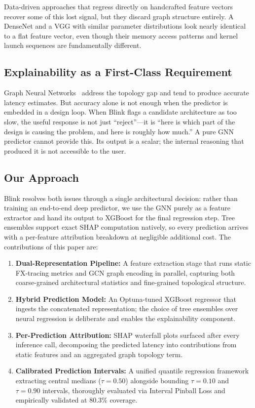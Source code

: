 \documentclass[conference]{IEEEtran}
\begin{document}
Data-driven approaches that regress directly on handcrafted feature
vectors~\cite{lee2021hardware} recover some of this lost signal, but they
discard graph structure entirely. A DenseNet and a VGG with similar parameter
distributions look nearly identical to a flat feature vector, even though their
memory access patterns and kernel launch sequences are fundamentally different.

\subsection{Explainability as a First-Class Requirement}

Graph Neural Networks~\cite{dudziak2020brp} address the topology gap and tend to
produce accurate latency estimates. But accuracy alone is not enough when the
predictor is embedded in a design loop. When Blink flags a candidate architecture
as too slow, the useful response is not just ``reject''---it is ``here is which
part of the design is causing the problem, and here is roughly how much.'' A pure
GNN predictor cannot provide this. Its output is a scalar; the internal reasoning
that produced it is not accessible to the user.

\subsection{Our Approach}

Blink resolves both issues through a single architectural decision: rather than
training an end-to-end deep predictor, we use the GNN purely as a feature
extractor and hand its output to XGBoost for the final regression step. Tree
ensembles support exact SHAP computation natively, so every prediction arrives
with a per-feature attribution breakdown at negligible additional cost. The
contributions of this paper are:

\begin{enumerate}
    \item \textbf{Dual-Representation Pipeline:} A feature extraction stage that
    runs static FX-tracing metrics and GCN graph encoding in parallel, capturing
    both coarse-grained architectural statistics and fine-grained topological
    structure.
    \item \textbf{Hybrid Prediction Model:} An Optuna-tuned XGBoost regressor
    that ingests the concatenated representation; the choice of tree ensembles
    over neural regression is deliberate and enables the explainability
    component.
    \item \textbf{Per-Prediction Attribution:} SHAP waterfall plots surfaced
    after every inference call, decomposing the predicted latency into
    contributions from static features and an aggregated graph topology term.
    \item \textbf{Calibrated Prediction Intervals:} A unified quantile regression
    framework extracting central medians ($\tau=0.50$) alongside bounding
    $\tau=0.10$ and $\tau=0.90$ intervals, thoroughly evaluated via Interval
    Pinball Loss and empirically validated at 80.3\% coverage.
\end{enumerate}
\end{document}
